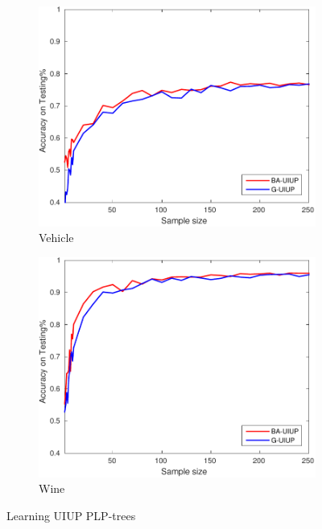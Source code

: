 \begin{figure}[ht]
\begin{subfigure}[b]{0.3\textwidth}
  	\includegraphics[width=\textwidth]{figs/PLPTF/Trees/VehicleDownsampledFurther_Trees_X_MH.pdf}
  	\caption{Vehicle}
		\label{fig:V1}
	\end{subfigure}
  \begin{subfigure}[b]{0.3\textwidth}
		\centering
  	\includegraphics[width=\textwidth]{figs/PLPTF/Trees/WineDownsampled_Trees_X_MH.pdf}
  	\caption{Wine}
		\label{fig:W1}
	\end{subfigure}

  \caption{Learning UIUP PLP-trees}
  \label{fig:trees1}
\end{figure}

